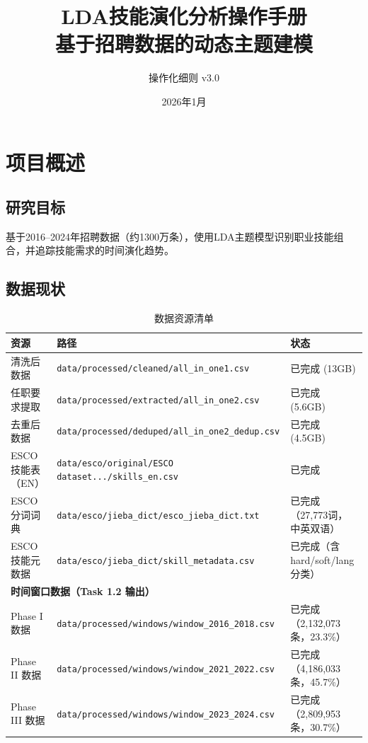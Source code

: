 \documentclass[12pt, a4paper]{ctexart}
\title{\textbf{LDA技能演化分析操作手册} \\ \large 基于招聘数据的动态主题建模}
\author{操作化细则 v3.0}
\date{2026年1月}
\begin{document}
\maketitle
\tableofcontents
\newpage

\section{项目概述}

\subsection{研究目标}
基于2016--2024年招聘数据（约1300万条），使用LDA主题模型识别职业技能组合，并追踪技能需求的时间演化趋势。

\subsection{数据现状}

\begin{table}[h]
\centering
\caption{数据资源清单}
\begin{tabular}{lll}
\toprule
\textbf{资源} & \textbf{路径} & \textbf{状态} \\
\midrule
清洗后数据 & \texttt{data/processed/cleaned/all\_in\_one1.csv} & 已完成 (13GB) \\
任职要求提取 & \texttt{data/processed/extracted/all\_in\_one2.csv} & 已完成 (5.6GB) \\
去重后数据 & \texttt{data/processed/deduped/all\_in\_one2\_dedup.csv} & 已完成 (4.5GB) \\
ESCO技能表（EN） & \texttt{data/esco/original/ESCO dataset.../skills\_en.csv} & 已完成 \\
ESCO分词词典 & \texttt{data/esco/jieba\_dict/esco\_jieba\_dict.txt} & 已完成（27,773词，中英双语） \\
ESCO技能元数据 & \texttt{data/esco/jieba\_dict/skill\_metadata.csv} & 已完成（含 hard/soft/lang 分类） \\
\midrule
\multicolumn{3}{l}{\textbf{时间窗口数据（Task 1.2 输出）}} \\
Phase I 数据 & \texttt{data/processed/windows/window\_2016\_2018.csv} & 已完成（2,132,073条，23.3\%） \\
Phase II 数据 & \texttt{data/processed/windows/window\_2021\_2022.csv} & 已完成（4,186,033条，45.7\%） \\
Phase III 数据 & \texttt{data/processed/windows/window\_2023\_2024.csv} & 已完成（2,809,953条，30.7\%） \\
\bottomrule
\end{tabular}
\end{table}
\end{document}
